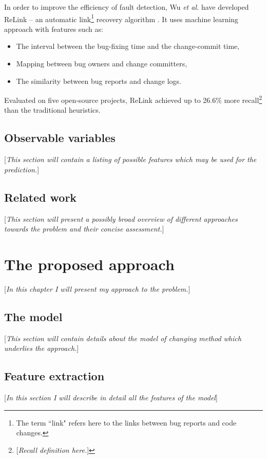 \documentclass{pracamgr}
\begin{document}
In order to improve the efficiency of fault detection, Wu \textit{et al.} have developed ReLink -- an automatic link\footnote{The term ``link" refers here to the links between bug reports and code changes.} recovery algorithm \cite{ReLink}. It uses machine learning approach with features such as:
\begin{itemize}
	\item The interval between the bug-fixing time and the change-commit time,
	\item Mapping between bug owners and change committers,
	\item The similarity between bug reports and change logs.
\end{itemize}
Evaluated on five open-source projects, ReLink achieved up to 26.6\% more recall\footnote{[\textit{Recall definition here.}]} than the traditional heuristics.

\section{Observable variables}
\label{sec:observable_variables}
[\textit{This section will contain a listing of possible features which may be used for the prediction.}]

\section{Related work}
\label{sec:realted_work}
[\textit{This section will present a possibly broad overview of different approaches towards the problem and their concise assessment.}]

\chapter{The proposed approach}
\label{cha:approach}
[\textit{In this chapter I will present my approach to the problem.}]

\section{The model}
\label{sec:model}
[\textit{This section will contain details about the model of changing method which underlies the approach.}]

\section{Feature extraction}
\label{sec:feature_extraction}
[\textit{In this section I will describe in detail all the features of the model}]
\end{document}
